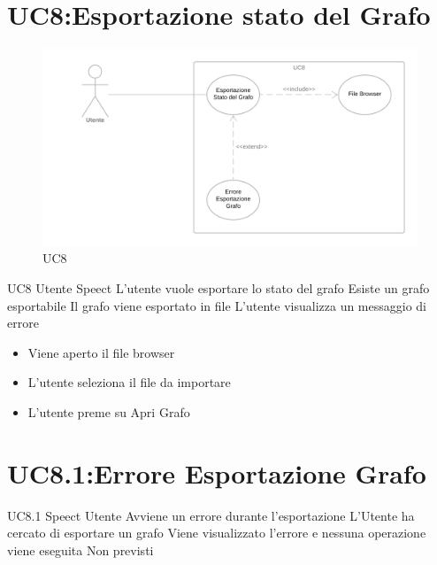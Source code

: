 \documentclass[../AnalisideiRequisiti.tex]{subfiles}
\begin{document}
\section{UC8:Esportazione stato del Grafo}
\begin{figure}[htp]
	\caption{UC8}
	\centering
	\includegraphics[width=\textwidth]{../img/UC08.png}
\end{figure}
\UserCase
{UC8}
{Utente}
{Speect}
{L'utente vuole esportare lo stato del grafo}
{Esiste un grafo esportabile}
{Il grafo viene esportato in file}
{ L'utente visualizza un messaggio di errore }
{
	{\begin{itemize}
			\item{} Viene aperto il file browser
			\item{} L'utente seleziona il file da importare
			\item{} L'utente preme su Apri Grafo
\end{itemize}}}

\section{UC8.1:Errore Esportazione Grafo}
\UserCase
{UC8.1}
{Speect}
{Utente}
{Avviene un errore durante l'esportazione}
{L'Utente ha cercato di esportare un grafo}
{Viene visualizzato l'errore e nessuna operazione viene eseguita}
{Non previsti}
{}
\end{document}
